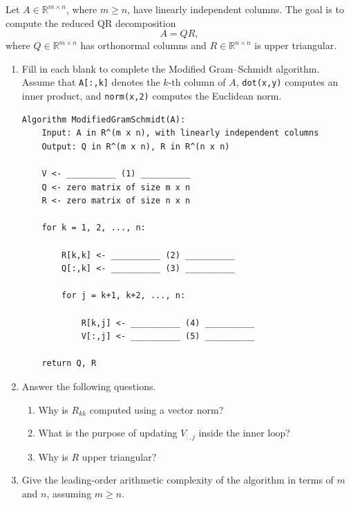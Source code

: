\documentclass{ximera}
\begin{document}
\begin{exercise}

Let $A \in \mathbb{R}^{m \times n}$, where $m \geq n$,
have linearly independent columns. The goal is to compute the
reduced QR decomposition
\[
A = QR,
\]
where $Q \in \mathbb{R}^{m \times n}$ has orthonormal columns
and $R \in \mathbb{R}^{n \times n}$ is upper triangular.

\begin{enumerate}
    \item Fill in each blank to complete the Modified Gram--Schmidt
algorithm. Assume that \texttt{A[:,k]} denotes the $k$-th
column of $A$, \texttt{dot(x,y)} computes an inner product,
and \texttt{norm(x,2)} computes the Euclidean norm.

\begin{lstlisting}
Algorithm ModifiedGramSchmidt(A):
    Input: A in R^(m x n), with linearly independent columns
    Output: Q in R^(m x n), R in R^(n x n)

    V <- __________ (1) __________
    Q <- zero matrix of size m x n
    R <- zero matrix of size n x n

    for k = 1, 2, ..., n:

        R[k,k] <- __________ (2) __________
        Q[:,k] <- __________ (3) __________

        for j = k+1, k+2, ..., n:

            R[k,j] <- __________ (4) __________
            V[:,j] <- __________ (5) __________

    return Q, R
\end{lstlisting}

\item Answer the following questions.
\begin{enumerate}[label=\arabic*.]
    \item Why is $R_{kk}$ computed using a vector norm?
    \item What is the purpose of updating $V_{:,j}$ inside
    the inner loop?
    \item Why is $R$ upper triangular?
\end{enumerate}

\item Give the leading-order arithmetic complexity of the algorithm
in terms of $m$ and $n$, assuming $m \geq n$.

\end{enumerate}
\newpage



\end{exercise}
\end{document}
